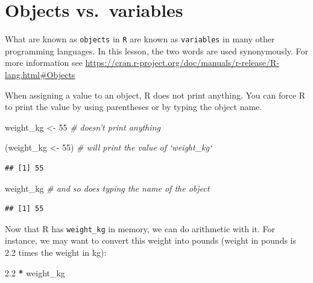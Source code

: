 \documentclass[]{book}
\newenvironment{Shaded}{\begin{snugshade}}{\end{snugshade}}
\newcommand{\CommentTok}[1]{\textcolor[rgb]{0.56,0.35,0.01}{\textit{#1}}}
\newcommand{\DecValTok}[1]{\textcolor[rgb]{0.00,0.00,0.81}{#1}}
\newcommand{\FloatTok}[1]{\textcolor[rgb]{0.00,0.00,0.81}{#1}}
\newcommand{\NormalTok}[1]{#1}
\newcommand{\OperatorTok}[1]{\textcolor[rgb]{0.81,0.36,0.00}{\textbf{#1}}}
\newcommand{\StringTok}[1]{\textcolor[rgb]{0.31,0.60,0.02}{#1}}
\begin{document}
\hypertarget{objects-vs.variables}{%
\section{Objects vs.~variables}\label{objects-vs.variables}}

What are known as \texttt{objects} in \texttt{R} are known as \texttt{variables} in many other programming languages. In this lesson, the two words are used synonymously. For more information see \url{https://cran.r-project.org/doc/manuals/r-release/R-lang.html\#Objects}

When assigning a value to an object, R does not print anything. You can force R to print the value by using parentheses or by typing the object name.

\begin{Shaded}
\begin{Highlighting}[]
\NormalTok{weight_kg <-}\StringTok{ }\DecValTok{55} \CommentTok{#  doesn't print anything}
\end{Highlighting}
\end{Shaded}

\begin{Shaded}
\begin{Highlighting}[]
\NormalTok{(weight_kg <-}\StringTok{ }\DecValTok{55}\NormalTok{) }\CommentTok{#  will print the value of `weight_kg`}
\end{Highlighting}
\end{Shaded}

\begin{verbatim}
## [1] 55
\end{verbatim}

\begin{Shaded}
\begin{Highlighting}[]
\NormalTok{weight_kg         }\CommentTok{#  and so does typing the name of the object}
\end{Highlighting}
\end{Shaded}

\begin{verbatim}
## [1] 55
\end{verbatim}

Now that R has \texttt{weight\_kg} in memory, we can do arithmetic with it. For instance, we may want to convert this weight into pounds (weight in pounds is 2.2 times the weight in kg):

\begin{Shaded}
\begin{Highlighting}[]
\FloatTok{2.2} \OperatorTok{*}\StringTok{ }\NormalTok{weight_kg}
\end{Highlighting}
\end{Shaded}
\end{document}
